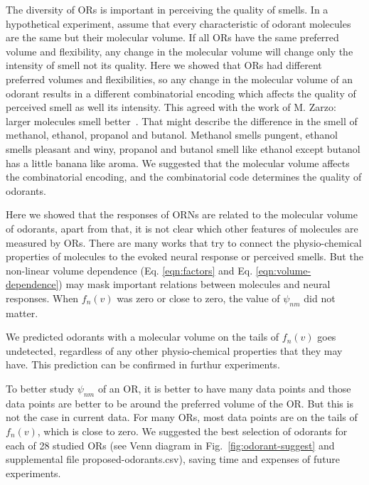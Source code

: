\documentclass[11pt]{paper} %
\newcommand{\numberofreceptors}{ 28 }
\begin{document}
The diversity of ORs is important in perceiving the quality of smells. 
In a hypothetical experiment, 
assume that every characteristic of odorant molecules are the same but their molecular volume.
If all ORs  have the same preferred volume and flexibility, 
any change in the molecular volume will change only the intensity of smell not its quality.
Here we showed that ORs  had different preferred volumes and flexibilities, 
so any change in the molecular volume of an odorant results in a different combinatorial encoding which affects the quality of perceived smell as well its intensity.
This agreed with the work of M. Zarzo: larger molecules  smell better~\cite{zarzo2011}.
That might describe the difference in the smell of methanol, ethanol, propanol and butanol. 
Methanol smells pungent, ethanol smells pleasant and winy, propanol and butanol smell like ethanol except butanol has a little banana like aroma.
We suggested that the molecular volume affects the combinatorial encoding, 
and the combinatorial code determines the quality of odorants.

Here we showed that the responses of ORNs are related to the molecular volume of odorants, 
apart from that, it is not clear which other features of molecules are measured by ORs. 
There are many works that try to connect the physio-chemical properties of molecules to the evoked neural response or perceived smells.
But the non-linear volume dependence (Eq. \ref{eqn:factors} and Eq. \ref{eqn:volume-dependence})  
may mask important relations between molecules and neural responses.
When $f_n(v)$ was zero or close to zero, 
the value of $\psi_{nm}$ did not matter. 

We predicted odorants with a molecular volume on the tails of $f_n(v)$ goes undetected, 
regardless of any other physio-chemical properties that they may have. 
This prediction can be confirmed in furthur experiments. 

To better study $\psi_{nm}$ of an OR, 
it is better to have many data points and those data points are better to be around the preferred volume of the OR.
But this is not the case in current data. 
For many ORs, 
most data points are on the tails of $f_n(v)$, which is close to zero.
We suggested the best selection of odorants for each of \numberofreceptors studied ORs 
(see Venn diagram in Fig.~\ref{fig:odorant-suggest} and supplemental file proposed-odorants.csv), 
saving time and expenses of future experiments. 

\end{document}

